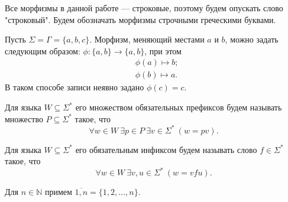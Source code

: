 Все морфизмы в данной работе --- строковые, поэтому будем опускать слово "строковый".
Будем обозначать морфизмы строчными греческими буквами.

\begin{Example}
  Пусть $\Sigma = \Gamma = \{a, b, c\}$. Морфизм, меняющий местами $a$ и $b$, можно задать следующим образом:
  $\phi\!: \{a, b\} \to \{a, b\}$, при этом 
  \begin{align*}
    & \phi(a) \mapsto b; \\
    & \phi(b) \mapsto a.
  \end{align*}
  В таком способе записи неявно задано $\phi(c) = c$.
\end{Example}

\begin{Definition}
Для языка $W \subseteq \Sigma^*$ его множеством обязательных префиксов будем называть множество $P \subseteq \Sigma^*$ такое, что 
$$
\forall w \in W \ \exists p \in P \ \exists v \in \Sigma^* \ (w = pv).
$$
\end{Definition}

\begin{Definition}
  Для языка $W \subseteq \Sigma^*$ его обязательным инфиксом будем называть слово $f \in \Sigma^*$ такое, что 
  $$
  \forall w \in W \ \exists v, u \in \Sigma^* \ (w = vfu).
  $$
\end{Definition}




Для $n \in \mathbb{N}$ примем $\overline{1,n} = \{1, 2, \ldots, n\}$.


